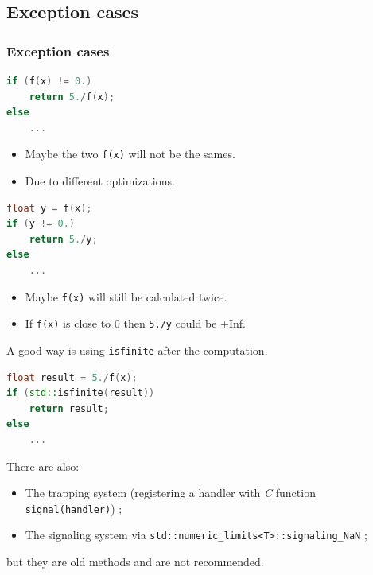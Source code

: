 \documentclass{beamer}
\begin{document}
\subsection{Exception cases}

\begin{frame}[fragile]
    \frametitle{Exception cases}

    \begin{lstlisting}[language=c++]
if (f(x) != 0.)
    return 5./f(x);
else
    ...
    \end{lstlisting}

    \begin{itemize}
        \item Maybe the two \verb'f(x)' will not be the sames.
        \item Due to different optimizations.
    \end{itemize}
\end{frame}

\begin{frame}[fragile]
    \begin{lstlisting}[language=c++]
float y = f(x);
if (y != 0.)
    return 5./y;
else
    ...
    \end{lstlisting}

    \begin{itemize}
        \item Maybe \verb'f(x)' will still be calculated twice.
        \item If \verb'f(x)' is close to $0$ then \verb'5./y' could be +Inf.
    \end{itemize}
\end{frame}

\begin{frame}[fragile]
    A good way is using \verb'isfinite' after the computation.

    \begin{lstlisting}[language=c++]
float result = 5./f(x);
if (std::isfinite(result))
    return result;
else
    ...
    \end{lstlisting}
\end{frame}

\begin{frame}[fragile]
    There are also:
    \begin{itemize}
        \item The trapping system (registering a handler with \emph{C} function \verb'signal(handler)') ;
        \item The signaling system via \verb'std::numeric_limits<T>::signaling_NaN' ;
    \end{itemize}
    but they are old methods and are not recommended.
\end{frame}
\end{document}
